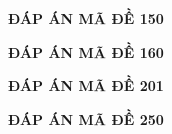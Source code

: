 \documentclass[11pt]{article}
\begin{document}
\begin{center}
\textbf{ĐÁP ÁN MÃ ĐỀ 150}
\end{center}
\indapanso
\begin{center}
\begin{multicols}{10}
\begin{enumerate}[\causo]
\foreachproblem[made150]{\item\thisproblem}
\end{enumerate}
\end{multicols}
\end{center}

\begin{center}
\textbf{ĐÁP ÁN MÃ ĐỀ 160}
\end{center}
\indapanso
\begin{center}
\begin{multicols}{10}
\begin{enumerate}[\causo]
\foreachproblem[made160]{\item\thisproblem}
\end{enumerate}
\end{multicols}
\end{center}

\begin{center}
\textbf{ĐÁP ÁN MÃ ĐỀ 201}
\end{center}
\indapanso
\begin{center}
\begin{enumerate}[\causo]
\begin{multicols}{10}
\foreachproblem[made201]{\item\thisproblem}
\end{multicols}
\end{enumerate}
\end{center}

\begin{center}
\textbf{ĐÁP ÁN MÃ ĐỀ 250}
\end{center}
\indapanso
\begin{center}
\begin{enumerate}[\causo]
\begin{multicols}{10}
\foreachproblem[made250]{\item\thisproblem}
\end{multicols}
\end{enumerate}
\end{center}
\end{document}
